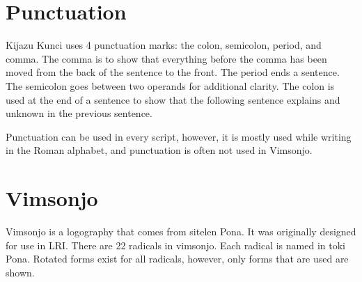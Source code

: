 \documentclass{clgrammar}
\begin{document}
\chapter{Punctuation}
Kijazu Kunci uses 4 punctuation marks: the colon, semicolon, period, and comma. The comma is to show that everything before the comma has been moved from the back of the sentence to the front. The period ends a sentence. The semicolon goes between two operands for additional clarity. The colon is used at the end of a sentence to show that the following sentence explains and unknown in the previous sentence. 

Punctuation can be used in every script, however, it is mostly used while writing in the Roman alphabet, and punctuation is often not used in Vimsonjo.

\chapter{Vimsonjo}
Vimsonjo is a logography that comes from sitelen Pona. It was originally designed for use in LRI. There are 22 radicals in vimsonjo. Each radical is named in toki Pona. Rotated forms exist for all radicals, however, only forms that are used are shown.
\end{document}
